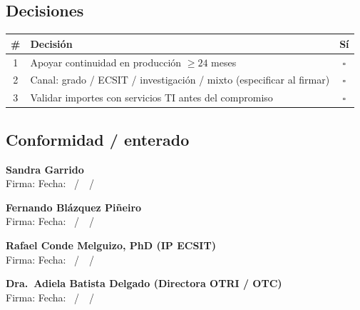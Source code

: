 \documentclass[11pt,a4paper]{scrartcl}
\begin{document}
\subsection*{Decisiones}
\renewcommand{\arraystretch}{1.3}
\begin{tabularx}{\textwidth}{@{}c>{\raggedright\arraybackslash}X c@{}}
  \toprule
  \textbf{\#} & \textbf{Decisión} & \textbf{Sí} \\
  \midrule
  1 & Apoyar continuidad en producción $\geq 24$ meses & $\square$ \\
  2 & Canal: grado / ECSIT / investigación / mixto (especificar al firmar) & $\square$ \\
  3 & Validar importes con servicios TI antes del compromiso & $\square$ \\
  \bottomrule
\end{tabularx}

\subsection*{Conformidad / enterado}
\vspace{0.55em}
\noindent\textbf{Sandra Garrido}\\
Firma: \hrulefill\quad Fecha: \underline{\hspace{1.1cm}}~/~\underline{\hspace{1.1cm}}~/~\underline{\hspace{2cm}}

\vspace{0.7em}
\noindent\textbf{Fernando Blázquez Piñeiro}\\
Firma: \hrulefill\quad Fecha: \underline{\hspace{1.1cm}}~/~\underline{\hspace{1.1cm}}~/~\underline{\hspace{2cm}}

\vspace{0.7em}
\noindent\textbf{Rafael Conde Melguizo, PhD (IP ECSIT)}\\
Firma: \hrulefill\quad Fecha: \underline{\hspace{1.1cm}}~/~\underline{\hspace{1.1cm}}~/~\underline{\hspace{2cm}}

\vspace{0.7em}
\noindent\textbf{Dra.\ Adiela Batista Delgado (Directora OTRI / OTC)}\\
Firma: \hrulefill\quad Fecha: \underline{\hspace{1.1cm}}~/~\underline{\hspace{1.1cm}}~/~\underline{\hspace{2cm}}
\end{document}
